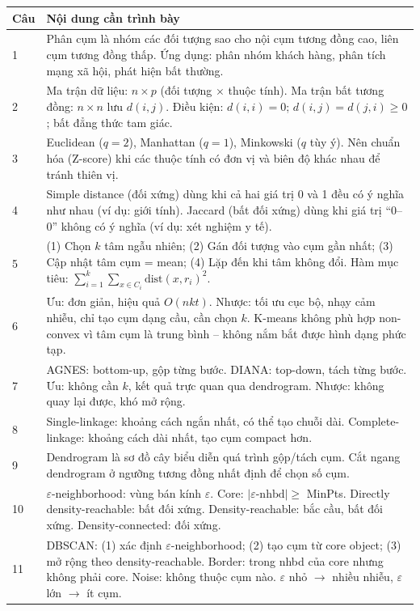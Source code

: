 \documentclass[10pt]{article}
\begin{document}
\begin{singlespace}
\begin{longtable}{|p{}|p{}|}
\hline
\textbf{Câu} & \textbf{Nội dung cần trình bày} \\
\hline
\endhead
1 & Phân cụm là nhóm các đối tượng sao cho nội cụm tương đồng cao, liên cụm tương đồng thấp. Ứng dụng: phân nhóm khách hàng, phân tích mạng xã hội, phát hiện bất thường. \\
\hline
2 & Ma trận dữ liệu: $n \times p$ (đối tượng $\times$ thuộc tính). Ma trận bất tương đồng: $n \times n$ lưu $d(i,j)$. Điều kiện: $d(i,i)=0$; $d(i,j)=d(j,i)\geq 0$; bất đẳng thức tam giác. \\
\hline
3 & Euclidean ($q=2$), Manhattan ($q=1$), Minkowski ($q$ tùy ý). Nên chuẩn hóa (Z-score) khi các thuộc tính có đơn vị và biên độ khác nhau để tránh thiên vị. \\
\hline
4 & Simple distance (đối xứng) dùng khi cả hai giá trị 0 và 1 đều có ý nghĩa như nhau (ví dụ: giới tính). Jaccard (bất đối xứng) dùng khi giá trị ``0--0'' không có ý nghĩa (ví dụ: xét nghiệm y tế). \\
\hline
5 & (1) Chọn $k$ tâm ngẫu nhiên; (2) Gán đối tượng vào cụm gần nhất; (3) Cập nhật tâm cụm = mean; (4) Lặp đến khi tâm không đổi. Hàm mục tiêu: $\sum_{i=1}^k\sum_{x\in C_i}\text{dist}(x,r_i)^2$. \\
\hline
6 & Ưu: đơn giản, hiệu quả $O(nkt)$. Nhược: tối ưu cục bộ, nhạy cảm nhiễu, chỉ tạo cụm dạng cầu, cần chọn $k$. K-means không phù hợp non-convex vì tâm cụm là trung bình -- không nắm bắt được hình dạng phức tạp. \\
\hline
7 & AGNES: bottom-up, gộp từng bước. DIANA: top-down, tách từng bước. Ưu: không cần $k$, kết quả trực quan qua dendrogram. Nhược: không quay lại được, khó mở rộng. \\
\hline
8 & Single-linkage: khoảng cách ngắn nhất, có thể tạo chuỗi dài. Complete-linkage: khoảng cách dài nhất, tạo cụm compact hơn. \\
\hline
9 & Dendrogram là sơ đồ cây biểu diễn quá trình gộp/tách cụm. Cắt ngang dendrogram ở ngưỡng tương đồng nhất định để chọn số cụm. \\
\hline
10 & $\varepsilon$-neighborhood: vùng bán kính $\varepsilon$. Core: $|\varepsilon\text{-nhbd}|\geq$ MinPts. Directly density-reachable: bất đối xứng. Density-reachable: bắc cầu, bất đối xứng. Density-connected: đối xứng. \\
\hline
11 & DBSCAN: (1) xác định $\varepsilon$-neighborhood; (2) tạo cụm từ core object; (3) mở rộng theo density-reachable. Border: trong nhbd của core nhưng không phải core. Noise: không thuộc cụm nào. $\varepsilon$ nhỏ $\to$ nhiều nhiễu, $\varepsilon$ lớn $\to$ ít cụm. \\

\end{longtable}
\end{singlespace}
\end{document}
